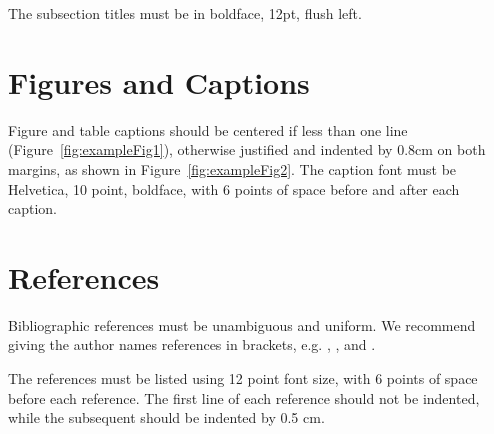 \documentclass[12pt]{article}
\begin{document}
The subsection titles must be in boldface, 12pt, flush left.

\section{Figures and Captions}\label{sec:figs}


Figure and table captions should be centered if less than one line
(Figure~\ref{fig:exampleFig1}), otherwise justified and indented by 0.8cm on
both margins, as shown in Figure~\ref{fig:exampleFig2}. The caption font must
be Helvetica, 10 point, boldface, with 6 points of space before and after each
caption.

\section{References}

Bibliographic references must be unambiguous and uniform.  We recommend giving
the author names references in brackets, e.g. \cite{knuth:84},
\cite{boulic:91}, and \cite{smith:99}.

The references must be listed using 12 point font size, with 6 points of space
before each reference. The first line of each reference should not be
indented, while the subsequent should be indented by 0.5 cm.



\end{document}
